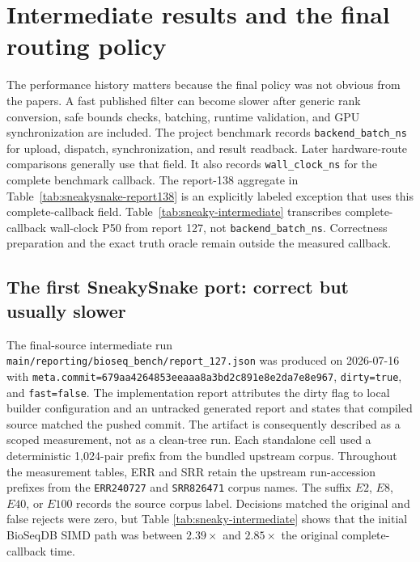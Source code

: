 \section{Intermediate results and the final routing policy}
\label{sec:prefilter-results}

The performance history matters because the final policy was not obvious from
the papers.  A fast published filter can become slower after generic rank
conversion, safe bounds checks, batching, runtime validation, and GPU
synchronization are included.  The project benchmark records
\texttt{backend\_batch\_ns} for upload, dispatch, synchronization, and result
readback.  Later hardware-route comparisons generally use that field.  It also
records \texttt{wall\_clock\_ns} for the complete benchmark callback.  The
report-138 aggregate in Table~\ref{tab:sneakysnake-report138} is an explicitly
labeled exception that uses this complete-callback field.
Table~\ref{tab:sneaky-intermediate} transcribes complete-callback wall-clock
P50 from report 127, not \texttt{backend\_batch\_ns}.  Correctness preparation
and the exact truth oracle remain outside the measured callback.

\subsection{The first SneakySnake port: correct but usually slower}

The final-source intermediate run
\texttt{main/reporting/bioseq\_bench/report\_127.json} was produced on
2026-07-16 with
\texttt{meta.commit=679aa4264853eeaaa8a3bd2c891e8e2da7e8e967},
\texttt{dirty=true}, and \texttt{fast=false}.  The implementation report
attributes the dirty flag to local builder configuration and an untracked
generated report and states that compiled source matched the pushed commit.
The artifact is consequently described as a scoped measurement, not as a
clean-tree run.  Each standalone cell used a
deterministic 1,024-pair prefix from the bundled upstream corpus.  Throughout
the measurement tables, ERR and SRR retain the upstream
run-accession prefixes from the
\texttt{ERR240727} and \texttt{SRR826471} corpus names.  The suffix \(E2\),
\(E8\), \(E40\), or \(E100\) records the source corpus label.  Decisions
matched the original and false rejects were zero, but Table
\ref{tab:sneaky-intermediate} shows that the initial BioSeqDB SIMD path was
between \(2.39\times\) and \(2.85\times\) the original complete-callback time.

